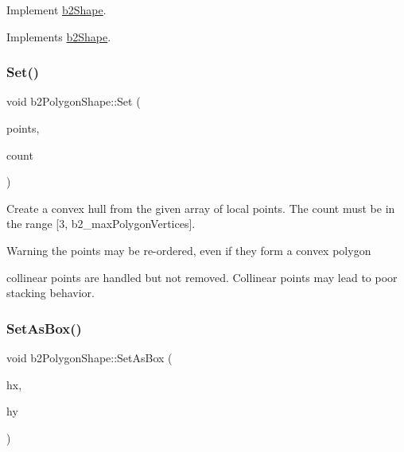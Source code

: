 Implement \mbox{\hyperlink{classb2_shape}{b2\+Shape}}. 



Implements \mbox{\hyperlink{classb2_shape_aee53a926f4fe64cd03693f6211ef6335}{b2\+Shape}}.

\mbox{\label{classb2_polygon_shape_a4d7b35550509f570814b97325a68966b}} 
\subsubsection{\texorpdfstring{Set()}{Set()}}
{\footnotesize\ttfamily void b2\+Polygon\+Shape\+::\+Set (\begin{DoxyParamCaption}\item[{const \mbox{\hyperlink{structb2_vec2}{b2\+Vec2}} $\ast$}]{points,  }\item[{\mbox{\hyperlink{b2_settings_8h_a43d43196463bde49cb067f5c20ab8481}{int32}}}]{count }\end{DoxyParamCaption})}

Create a convex hull from the given array of local points. The count must be in the range \mbox{[}3, b2\+\_\+max\+Polygon\+Vertices\mbox{]}. \begin{DoxyWarning}{Warning}
the points may be re-\/ordered, even if they form a convex polygon 

collinear points are handled but not removed. Collinear points may lead to poor stacking behavior. 
\end{DoxyWarning}
\mbox{\label{classb2_polygon_shape_a6bb90df8b4a40d1c53b64cc352a855dd}} 
\subsubsection{\texorpdfstring{SetAsBox()}{SetAsBox()}\hspace{0.1cm}{\footnotesize\ttfamily [1/2]}}
{\footnotesize\ttfamily void b2\+Polygon\+Shape\+::\+Set\+As\+Box (\begin{DoxyParamCaption}\item[{\mbox{\hyperlink{b2_settings_8h_aacdc525d6f7bddb3ae95d5c311bd06a1}{float32}}}]{hx,  }\item[{\mbox{\hyperlink{b2_settings_8h_aacdc525d6f7bddb3ae95d5c311bd06a1}{float32}}}]{hy }\end{DoxyParamCaption})}

